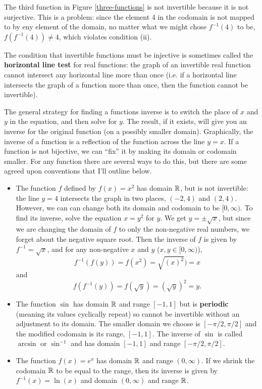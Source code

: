 The third function in Figure \ref{three-functions} is not invertible because it is not surjective. This is a problem: since the element 4 in the codomain is not mapped to by eny element of the domain, no matter what we might chose $f^{-1}(4)$ to be, $f(f^{-1}(4))\neq 4$, which violates condition (ii).

The condition that invertible functions must be injective is sometimes called the \textbf{horizontal line test} for real functions: the graph of an invertible real function cannot intersect any horizontal line more than once (i.e. if a horizontal line intersects the graph of a function more than once, then the function cannot be invertible). 

The general strategy for finding a functions inverse is to switch the place of $x$ and $y$ in the equation, and then solve for $y$. The result, if it exists, will give you an inverse for the original function (on a possibly smaller domain). Graphically, the inverse of a function is a reflection of the function across the line $y=x$. If a function is not bijective, we can ``fix'' it by making its domain or codomain smaller. For any function there are several ways to do this, but there are some agreed upon conventions that I'll outline below.

\begin{itemize}
\item The function $f$ defined by $f(x)=x^2$ has domain $\mathbb{R}$, but is not invertible: the line $y=4$ intersects the graph in two places, $(-2,4)$ and $(2,4)$. However, we can can change both its domain and codomain to be $[0,\infty)$. To find its inverse, solve the equation $x=y^2$ for $y$. We get $y=\pm\sqrt{x}$, but since we are changing the domain of $f$ to only the non-negative real numbers, we forget about the negative square root. Then the inverse of $f$ is given by $f^{-1}=\sqrt{x}$, and for any non-negative $x$ and $y$ ($x,y\in[0,\infty)$),
$$f^{-1}(f(y))=f(x^2)=\sqrt{(x)^2})=x$$
and
$$f(f^{-1}(y))=f(\sqrt{y})=(\sqrt{y})^2=y.$$
\item The function $\sin$ has domain $\mathbb{R}$ and range $[-1,1]$ but is \textbf{periodic} (meaning its values cyclically repeat) so cannot be invertible without an adjustment to its domain. The smaller domain we choose is $[-\pi/2,\pi/2]$ and the modified codomain is its range, $[-1,1]$. The inverse of $\sin$ is called $\arcsin$ or $\sin^{-1}$ and has domain $[-1,1]$ and range $[-\pi/2,\pi/2]$. 
\item The function $f(x)=e^x$ has domain $\mathbb{R}$ and range $(0,\infty)$. If we shrink the codomain $\mathbb{R}$ to be equal to the range, then its inverse is given by $f^{-1}(x)=\ln(x)$ and domain $(0,\infty)$ and range $\mathbb{R}$.
\end{itemize}
